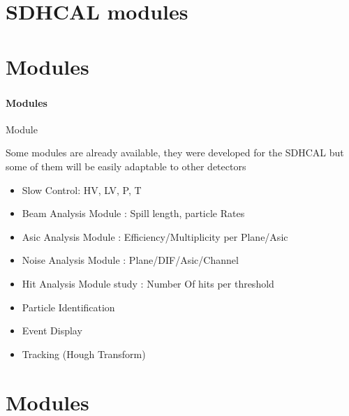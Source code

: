 \documentclass[8pt]{beamer}
\begin{document}
  \section{SDHCAL modules}

    \section{Modules}

  \begin{frame}
  \frametitle{\secname}
  \framesubtitle{Modules}
    \begin{block}{Module}

  Some modules are already available, they were developed for the SDHCAL but some of them will be easily adaptable to other detectors
    \begin{itemize}
      \item Slow Control: HV, LV, P, T
      \item Beam Analysis Module : Spill length, particle Rates
      \item Asic Analysis Module : Efficiency/Multiplicity per Plane/Asic
      \item Noise Analysis Module : Plane/DIF/Asic/Channel
      \item Hit Analysis Module study : Number Of hits per threshold
      \item Particle Identification
      \item Event Display
      \item Tracking (Hough Transform)
    \end{itemize}
\end{block}
  \end{frame}

 \section{Modules}
\end{document}
